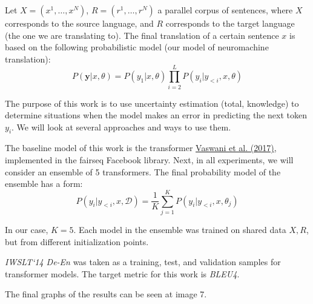 \documentclass[a4paper,14pt]{extarticle}
\newcommand{\bibref}[3]{\hyperlink{#1}{#2 (#3)}}
\begin{document}
	Let $X = (x^1, \dots, x^N)$, $R = (r^1, \dots, r^N)$ a parallel corpus of sentences, where $X$ corresponds to the source language, and $R$ corresponds to the target language (the one we are translating to). The final translation of a certain sentence $x$ is based on the following probabilistic model (our model of neuromachine translation):
	\begin{equation*}
		P(\textbf{y} | x, \theta) = P(y_1 | x, \theta) \prod_{i=2}^{L} P(y_i | y_{<i}, x, \theta)
	\end{equation*}
	
	The purpose of this work is to use uncertainty estimation (total, knowledge) to determine situations when the model makes an error in predicting the next token $y_i$. We will look at several approaches and ways to use them.

	The baseline model of this work is the transformer \bibref{transformer}{Vaswani et al.} {2017}, implemented in the fairseq Facebook library. Next, in all experiments, we will consider an ensemble of 5 transformers. The final probability model of the ensemble has a form:
	\begin{equation*}
		P(y_i | y_{<i}, x, \mathcal{D}) = \frac1{K} \sum_{j=1}^{K}P(y_i | y_{<i}, x, \theta_j)
	\end{equation*}
	
	In our case, $K=5$. Each model in the ensemble was trained on shared data $X, R$, but from different initialization points.

	\textit{IWSLT`14 De-En} was taken as a training, test, and validation samples for transformer models. The target metric for this work is \textit{BLEU4}.

	The final graphs of the results can be seen at image 7.
	
	\begin{figure}[t]
	\end{figure}
	
\end{document}
